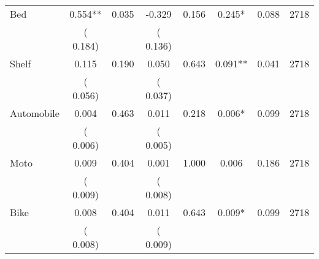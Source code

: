 \begin{tabular}{l*{7}{c}}
 Bed       &              0.554**       &        0.035  &             -0.329       &        0.156  &              0.245*       &              0.088 &  2718 \\ 
                       &       (       0.184)             &                               &       (       0.136)                     &                               &                                               &                                &                      \\ 

 Shelf       &              0.115       &        0.190  &              0.050       &        0.643  &              0.091**       &              0.041 &  2718 \\ 
                       &       (       0.056)             &                               &       (       0.037)                     &                               &                                               &                                &                      \\ 

 Automobile       &              0.004       &        0.463  &              0.011       &        0.218  &              0.006*       &              0.099 &  2718 \\ 
                       &       (       0.006)             &                               &       (       0.005)                     &                               &                                               &                                &                      \\ 

 Moto       &              0.009       &        0.404  &              0.001       &        1.000  &              0.006       &              0.186 &  2718 \\ 
                       &       (       0.009)             &                               &       (       0.008)                     &                               &                                               &                                &                      \\ 

 Bike       &              0.008       &        0.404  &              0.011       &        0.643  &              0.009*       &              0.099 &  2718 \\ 
                       &       (       0.008)             &                               &       (       0.009)                     &                               &                                               &                                &                      \\ 


\end{tabular}
